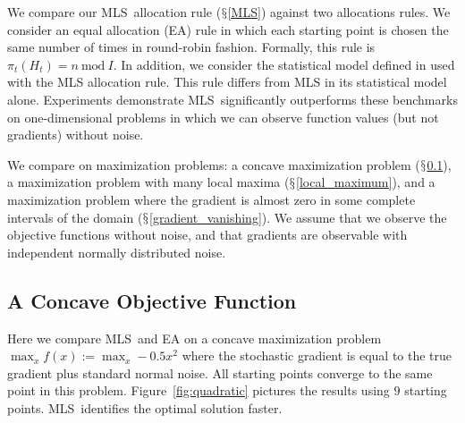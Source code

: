 \documentclass{wscpaperproc}
\theoremstyle{wsc}
\newcommand{\abbrv}{MLS}
\begin{document}
We compare our \abbrv\ allocation rule ($\mathsection$\ref{MLS}) against two allocations rules. We consider an equal allocation (EA) rule in which each starting point is chosen the same number of times in round-robin fashion.  Formally, this rule is  $\pi_t(H_t) =  n\ \mbox{mod}\ I$. In addition, we consider the statistical model defined in  used with the MLS allocation rule.  This rule differs from MLS in its statistical model alone. Experiments demonstrate \abbrv\ significantly outperforms these benchmarks on one-dimensional problems in which we can observe function values (but not gradients) without noise. 

We compare on maximization problems: a concave maximization problem ($\mathsection$\ref{concave}), a maximization problem with many local maxima ($\mathsection$\ref{local_maximum}), and a maximization problem where the gradient is almost zero in some complete intervals of the domain ($\mathsection$\ref{gradient_vanishing}).  We assume that we observe the objective functions without noise, and that gradients are observable with independent normally distributed noise.

\subsection{A Concave Objective Function}
\label{concave}

Here we compare \abbrv\ and EA on a concave maximization problem $\max_{x} f(x):= \max_{x} -0.5x^2$ where the stochastic gradient is equal to the true gradient plus standard normal noise.  All starting points converge to the same point in this problem. Figure~\ref{fig:quadratic} pictures the results using $9$ starting points. \abbrv\ identifies the optimal solution faster.
\end{document}
